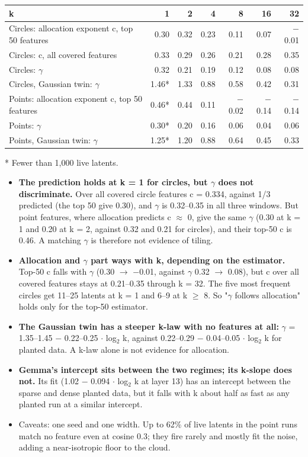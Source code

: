 \documentclass[11pt]{article}
\begin{document}
{\footnotesize\setlength{\tabcolsep}{4pt}
\begin{xltabular}{\textwidth}{>{\raggedright\arraybackslash}Xrrrrrr}
\toprule
\textbf{k} & \textbf{1} & \textbf{2} & \textbf{4} & \textbf{8} & \textbf{16} & \textbf{32} \\
\midrule
\endhead
\bottomrule
\endlastfoot
Circles: allocation exponent c, top 50 features & 0.30 & 0.32 & 0.23 & 0.11 & 0.07 & $-$0.01 \\
Circles: c, all covered features & 0.33 & 0.29 & 0.26 & 0.21 & 0.28 & 0.35 \\
Circles: $\gamma$ & 0.32 & 0.21 & 0.19 & 0.12 & 0.08 & 0.08 \\
Circles, Gaussian twin: $\gamma$ & 1.46* & 1.33 & 0.88 & 0.58 & 0.42 & 0.31 \\
Points: allocation exponent c, top 50 features & 0.46* & 0.44 & 0.11 & $-$0.02 & $-$0.14 & $-$0.14 \\
Points: $\gamma$ & 0.30* & 0.20 & 0.16 & 0.06 & 0.04 & 0.06 \\
Points, Gaussian twin: $\gamma$ & 1.25* & 1.20 & 0.88 & 0.64 & 0.45 & 0.33 \\
\end{xltabular}}

* Fewer than 1,000 live latents.

\begin{itemize}
\item \textbf{The prediction holds at k = 1 for circles, but $\gamma$ does not discriminate.} Over all covered circle features c = 0.334, against 1/3 predicted (the top 50 give 0.30), and $\gamma$ is 0.32--0.35 in all three windows. But point features, where allocation predicts c $\approx$ 0, give the same $\gamma$ (0.30 at k = 1 and 0.20 at k = 2, against 0.32 and 0.21 for circles), and their top-50 c is 0.46. A matching $\gamma$ is therefore not evidence of tiling.
\item \textbf{Allocation and $\gamma$ part ways with k, depending on the estimator.} Top-50 c falls with $\gamma$ (0.30 $\to$ $-$0.01, against $\gamma$ 0.32 $\to$ 0.08), but c over all covered features stays at 0.21--0.35 through k = 32. The five most frequent circles get 11--25 latents at k = 1 and 6--9 at k $\ge$ 8. So "$\gamma$ follows allocation" holds only for the top-50 estimator.
\item \textbf{The Gaussian twin has a steeper k-law with no features at all:} $\gamma$ = 1.35--1.45 $-$ 0.22--0.25 $\cdot$ log$_2$ k, against 0.22--0.29 $-$ 0.04--0.05 $\cdot$ log$_2$ k for planted data. A k-law alone is not evidence for allocation.
\item \textbf{Gemma's intercept sits between the two regimes; its k-slope does not.} Its fit (1.02 $-$ 0.094 $\cdot$ log$_2$ k at layer 13) has an intercept between the sparse and dense planted data, but it falls with k about half as fast as any planted run at a similar intercept.
\item Caveats: one seed and one width. Up to 62\% of live latents in the point runs match no feature even at cosine 0.3; they fire rarely and mostly fit the noise, adding a near-isotropic floor to the cloud.
\end{itemize}
\end{document}
